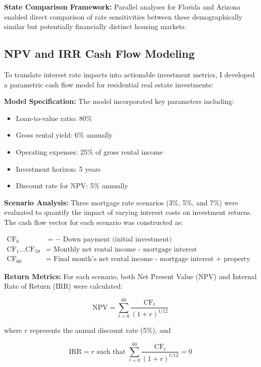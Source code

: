 \documentclass[12pt, stu, abstract]{apa7}
\begin{document}
\textbf{State Comparison Framework:} Parallel analyses for Florida and Arizona enabled direct comparison of rate sensitivities between these demographically similar but potentially financially distinct housing markets.

\subsection{NPV and IRR Cash Flow Modeling}
To translate interest rate impacts into actionable investment metrics, I developed a parametric cash flow model for residential real estate investments:

\textbf{Model Specification:} The model incorporated key parameters including:
\begin{itemize}
\item Loan-to-value ratio: 80\%
\item Gross rental yield: 6\% annually
\item Operating expenses: 25\% of gross rental income
\item Investment horizon: 5 years
\item Discount rate for NPV: 5\% annually
\end{itemize}

\textbf{Scenario Analysis:} Three mortgage rate scenarios (3\%, 5\%, and 7\%) were evaluated to quantify the impact of varying interest costs on investment returns. The cash flow vector for each scenario was constructed as:

\begin{align}
\text{CF}_0 &= -\text{ Down payment (initial investment)} \\
\text{CF}_1 \ldots \text{CF}_{59} &= \text{ Monthly net rental income - mortgage interest} \\
\text{CF}_{60} &= \text{ Final month's net rental income - mortgage interest + property sale proceeds}
\end{align}

\textbf{Return Metrics:} For each scenario, both Net Present Value (NPV) and Internal Rate of Return (IRR) were calculated:

\begin{equation}
\text{NPV} = \sum_{t=0}^{60} \frac{\text{CF}_t}{(1+r)^{t/12}}
\end{equation}

where $r$ represents the annual discount rate (5\%), and

\begin{equation}
\text{IRR} = r \text{ such that } \sum_{t=0}^{60} \frac{\text{CF}_t}{(1+r)^{t/12}} = 0
\end{equation}
\end{document}

